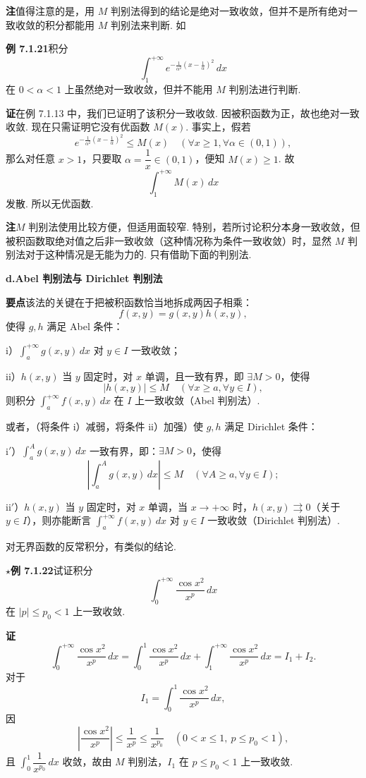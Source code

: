 \documentclass[UTF8, 12pt, fontset=fandol, oneside]{ctexart}
\begin{document}
\noindent\textbf{注}\quad 值得注意的是，用 $M$ 判别法得到的结论是绝对一致收敛，但并不是所有绝对一致收敛的积分都能用 $M$ 判别法来判断. 如

\noindent\textbf{例 7.1.21}\quad 积分
\[
\int_1^{+\infty}e^{-\frac1{\alpha^2}\left(x-\frac1\alpha\right)^2}\,dx
\]
在 $0<\alpha<1$ 上虽然绝对一致收敛，但并不能用 $M$ 判别法进行判断.

\noindent\textbf{证}\quad 在例 7.1.13 中，我们已证明了该积分一致收敛. 因被积函数为正，故也绝对一致收敛. 现在只需证明它没有优函数 $M(x)$. 事实上，假若
\[
e^{-\frac1{\alpha^2}\left(x-\frac1\alpha\right)^2}\le M(x)
\quad(\forall x\ge1,\forall\alpha\in(0,1)),
\]
那么对任意 $x>1$，只要取 $\alpha=\dfrac1x\in(0,1)$，便知 $M(x)\ge1$. 故
\[
\int_1^{+\infty}M(x)\,dx
\]
发散. 所以无优函数.

\noindent\textbf{注}\quad $M$ 判别法使用比较方便，但适用面较窄. 特别，若所讨论积分本身一致收敛，但被积函数取绝对值之后非一致收敛（这种情况称为条件一致收敛）时，显然 $M$ 判别法对于这种情况是无能为力的. 只有借助下面的判别法.

\noindent\textbf{d.\quad Abel 判别法与 Dirichlet 判别法}

\noindent\textbf{要点}\quad 该法的关键在于把被积函数恰当地拆成两因子相乘：
\[
f(x,y)=g(x,y)h(x,y),
\]
使得 $g,h$ 满足 Abel 条件：

i）$\displaystyle\int_a^{+\infty}g(x,y)\,dx$ 对 $y\in I$ 一致收敛；

ii）$h(x,y)$ 当 $y$ 固定时，对 $x$ 单调，且一致有界，即 $\exists M>0$，使得
\[
|h(x,y)|\le M\quad(\forall x\ge a,\forall y\in I),
\]
则积分 $\displaystyle\int_a^{+\infty}f(x,y)\,dx$ 在 $I$ 上一致收敛（Abel 判别法）.

或者，（将条件 i）减弱，将条件 ii）加强）使 $g,h$ 满足 Dirichlet 条件：

i$'$）$\displaystyle\int_a^A g(x,y)\,dx$ 一致有界，即：$\exists M>0$，使得
\[
\left|\int_a^A g(x,y)\,dx\right|\le M\quad(\forall A\ge a,\forall y\in I);
\]

ii$'$）$h(x,y)$ 当 $y$ 固定时，对 $x$ 单调，当 $x\to+\infty$ 时，$h(x,y)\rightrightarrows0$（关于 $y\in I$），则亦能断言 $\displaystyle\int_a^{+\infty}f(x,y)\,dx$ 对 $y\in I$ 一致收敛（Dirichlet 判别法）.

对无界函数的反常积分，有类似的结论.

\noindent\textbf{$\star$例 7.1.22}\quad 试证积分
\[
\int_0^{+\infty}\frac{\cos x^2}{x^p}\,dx
\]
在 $|p|\le p_0<1$ 上一致收敛.

\noindent\textbf{证}\quad
\[
\int_0^{+\infty}\frac{\cos x^2}{x^p}\,dx
=\int_0^1\frac{\cos x^2}{x^p}\,dx+\int_1^{+\infty}\frac{\cos x^2}{x^p}\,dx
=I_1+I_2.
\]
对于
\[
I_1=\int_0^1\frac{\cos x^2}{x^p}\,dx,
\]
因
\[
\left|\frac{\cos x^2}{x^p}\right|\le\frac1{x^p}\le\frac1{x^{p_0}}\quad(0<x\le1,\ p\le p_0<1),
\]
且 $\displaystyle\int_0^1\dfrac1{x^{p_0}}\,dx$ 收敛，故由 $M$ 判别法，$I_1$ 在 $p\le p_0<1$ 上一致收敛.
\end{document}
